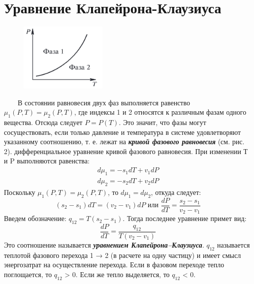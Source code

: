 \documentclass[a4, 12pt]{article}
\begin{document}
\section{Уравнение Клапейрона-Клаузиуса}
\begin{figure}
           \includegraphics[width=0.8\linewidth]{vpv2.png} 
           \caption{}
           \label{ris:image}
\end{figure}
\ \ \ \ В состоянии равновесия двух фаз выполняется равенство $\mu_1(P, T) = \mu_2(P, T)$, где индексы 1 и 2 относятся к различным фазам одного вещества. Отсюда следует $P = P(T)$. Это значит, что фазы могут сосуществовать, если только давление и температура в системе удовлетворяют указанному соотношению, т. е. лежат на {\itshape\textbf{кривой фазового равновесия}} (см. рис. 2). 
 дифференциальное уравнение кривой фазового равновесия. При изменении Т и P выполняются равенства:
\begin{eqnarray}
    d\mu_1 = -s_1dT + v_1dP\\
    d\mu_2 = -s_2dT + v_2dP
\end{eqnarray}
Поскольку $\mu_1(P, T) = \mu_2(P, T)$, то $d\mu_1 = d\mu_2$, откуда следует:
\begin{equation}
    (s_2 - s_1)dT = (v_2 - v_1)dP \text{\ или \ }  \frac{dP}{dT} = \frac{s_2 - s_1}{v_2 - v_1}
\end{equation}
\newpage
Введем обозначение: $q_{12} = T(s_2 - s_1)$. Тогда последнее уравнение примет вид:
\begin{equation}
    \frac{dP}{dT} = \frac{q_{12}}{T(v_2 - v_1)} 
\end{equation}
Это соотношение называется {\itshape\textbf{уравнением Клапейрона–Клаузиуса}}.
 $q_{12}$ называется теплотой фазового перехода 1 → 2 (в
расчете на одну частицу) и имеет смысл энергозатрат на осуществление перехода. Если в фазовом переходе тепло поглощается, то $q_{12}$ > 0.
Если же тепло выделяется, то $q_{12}$ < 0.
\end{document}
